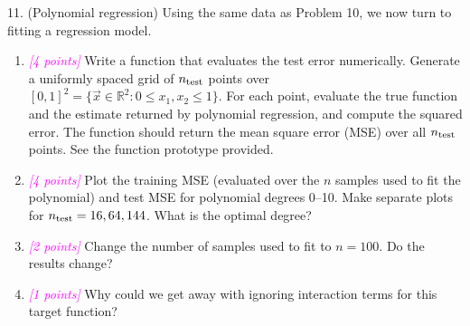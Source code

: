 \documentclass{article}
\newcommand{\R}{\mathbb{R}} %
\newcommand{\points}[1]{\small\textcolor{magenta}{\emph{[#1 points]}} \normalsize}
\begin{document}
11. (Polynomial regression)
Using the same data as Problem 10, we now turn to fitting a regression model.
\begin{enumerate}
\item \points{4} Write a function that evaluates the test error numerically.
  Generate a uniformly spaced grid of $n_{\rm test}$ points over 
  $[0,1]^2 = \{\vec x \in \R^2: 0 \leq x_1, x_2 \leq 1\}$.
  For each point, evaluate the true function and the estimate returned by polynomial regression,
  and compute the squared error.
  The function should return the mean square error (MSE) over all $n_{\rm test}$ points.
  See the function prototype provided.
\item \points{4}
  Plot the training MSE (evaluated over the $n$ samples used to fit the polynomial)
  and test MSE for polynomial degrees 0--10.
  Make separate plots for $n_{\rm test} = 16, 64, 144$.
  What is the optimal degree?
\item \points{2}
  Change the number of samples used to fit to $n = 100$. Do the results change?
\item \points{1}
  Why could we get away with ignoring interaction terms for this target function?
\end{enumerate}
\end{document}
